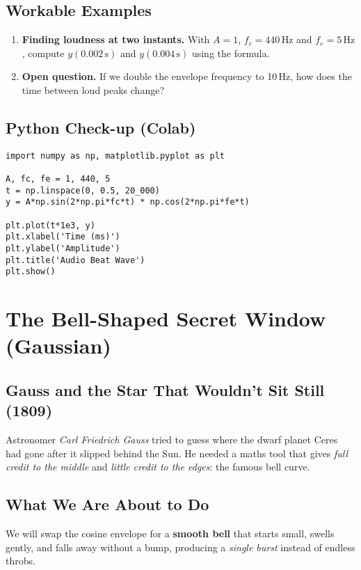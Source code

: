 \documentclass[12pt]{article}
\begin{document}
\subsection*{Workable Examples}
\begin{enumerate}
  \item \textbf{Finding loudness at two instants.}  With \(A=1\), \(f_{c}=440\,\text{Hz}\) and \(f_{e}=5\,\text{Hz}\), compute \(y(0.002\,\text{s})\) and \(y(0.004\,\text{s})\) using the formula.
  \item \textbf{Open question.}  If we double the envelope frequency to 10\,Hz, how does the time between loud peaks change?
\end{enumerate}

\subsection*{Python Check-up (Colab)}
\begin{lstlisting}[caption=Beats in Python,label=lst:beats]
import numpy as np, matplotlib.pyplot as plt

A, fc, fe = 1, 440, 5
t = np.linspace(0, 0.5, 20_000)
y = A*np.sin(2*np.pi*fc*t) * np.cos(2*np.pi*fe*t)

plt.plot(t*1e3, y)
plt.xlabel('Time (ms)')
plt.ylabel('Amplitude')
plt.title('Audio Beat Wave')
plt.show()
\end{lstlisting}

\section{The Bell-Shaped Secret Window (Gaussian)}
\subsection*{Gauss and the Star That Wouldn’t Sit Still (1809)}
Astronomer \textit{Carl Friedrich Gauss} tried to guess where the dwarf planet Ceres had gone after it slipped behind the Sun. He needed a maths tool that gives \emph{full credit to the middle} and \emph{little credit to the edges}: the famous bell curve.

\subsection*{What We Are About to Do}
We will swap the cosine envelope for a \textbf{smooth bell} that starts small, swells gently, and falls away without a bump, producing a \emph{single burst} instead of endless throbs.
\end{document}
